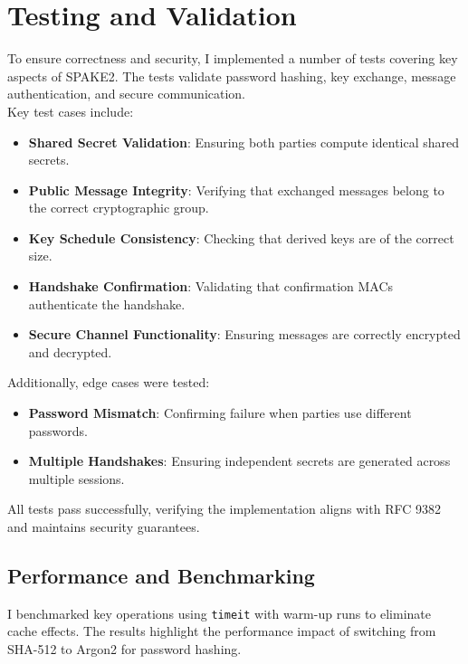 \documentclass[twoside,a4paper,12pt]{article}
\begin{document}
\section{Testing and Validation}

\label{sec:spake2_tests}

To ensure correctness and security, I implemented a number of tests covering key aspects of SPAKE2. The tests validate password hashing, key exchange, message authentication, and secure communication. \\

Key test cases include:
\begin{itemize}
    \item \textbf{Shared Secret Validation}: Ensuring both parties compute identical shared secrets.
    \item \textbf{Public Message Integrity}: Verifying that exchanged messages belong to the correct cryptographic group.
    \item \textbf{Key Schedule Consistency}: Checking that derived keys are of the correct size.
    \item \textbf{Handshake Confirmation}: Validating that confirmation MACs authenticate the handshake.
    \item \textbf{Secure Channel Functionality}: Ensuring messages are correctly encrypted and decrypted.
\end{itemize}

Additionally, edge cases were tested:

\begin{itemize}
    \item \textbf{Password Mismatch}: Confirming failure when parties use different passwords.
    \item \textbf{Multiple Handshakes}: Ensuring independent secrets are generated across multiple sessions.
\end{itemize}
All tests pass successfully, verifying the implementation aligns with RFC 9382 and maintains security guarantees.

\subsection{Performance and Benchmarking}
\label{subsec:spake2_benchmarks}

I benchmarked key operations using \texttt{timeit} with warm-up runs to eliminate cache effects. The results highlight the performance impact of switching from SHA-512 to Argon2 for password hashing.
\end{document}
